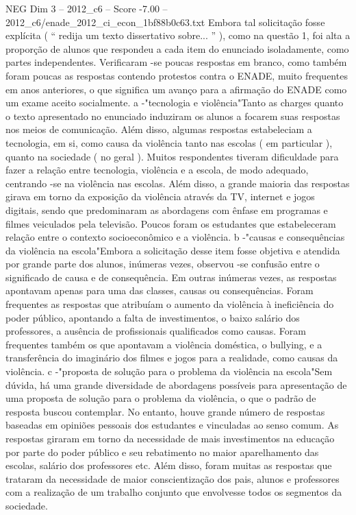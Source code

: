 \begin{textsample}{NEG Dim 3 – 2012\_c6 – Score -7.00 – 2012\_c6/enade\_2012\_ci\_econ\_1bf88b0c63.txt}
Embora tal solicitação fosse explícita ( “ redija um texto dissertativo sobre... ” ), como na questão 1, foi alta a proporção de alunos que respondeu a cada item do enunciado isoladamente, como partes independentes.
Verificaram -se poucas respostas em branco, como também foram poucas as respostas contendo protestos contra o ENADE, muito frequentes em anos anteriores, o que significa um avanço para a afirmação do ENADE como um exame aceito socialmente. a -"tecnologia e violência"Tanto as charges quanto o texto apresentado no enunciado induziram os alunos a focarem suas respostas nos meios de comunicação.
Além disso, algumas respostas estabeleciam a tecnologia, em si, como causa da violência tanto nas escolas ( em particular ), quanto na sociedade ( no geral ).
Muitos respondentes tiveram dificuldade para fazer a relação entre tecnologia, violência e a escola, de modo adequado, centrando -se na violência nas escolas.
Além disso, a grande maioria das respostas girava em torno da exposição da violência através da TV, internet e jogos digitais, sendo que predominaram as abordagens com ênfase em programas e filmes veiculados pela televisão.
Poucos foram os estudantes que estabeleceram relação entre o contexto socioeconômico e a violência. b -"causas e consequências da violência na escola"Embora a solicitação desse item fosse objetiva e atendida por grande parte dos alunos, inúmeras vezes, observou -se confusão entre o significado de causa e de consequência.
Em outras inúmeras vezes, as respostas apontavam apenas para uma das classes, causas ou consequências.
Foram frequentes as respostas que atribuíam o aumento da violência à ineficiência do poder público, apontando a falta de investimentos, o baixo salário dos professores, a ausência de profissionais qualificados como causas.
Foram frequentes também os que apontavam a violência doméstica, o bullying, e a transferência do imaginário dos filmes e jogos para a realidade, como causas da violência. c -"proposta de solução para o problema da violência na escola"Sem dúvida, há uma grande diversidade de abordagens possíveis para apresentação de uma proposta de solução para o problema da violência, o que o padrão de resposta buscou contemplar.
No entanto, houve grande número de respostas baseadas em opiniões pessoais dos estudantes e vinculadas ao senso comum.
As respostas giraram em torno da necessidade de mais investimentos na educação por parte do poder público e seu rebatimento no maior aparelhamento das escolas, salário dos professores etc.
Além disso, foram muitas as respostas que trataram da necessidade de maior conscientização dos pais, alunos e professores com a realização de um trabalho conjunto que envolvesse todos os segmentos da sociedade.

\end{textsample}
